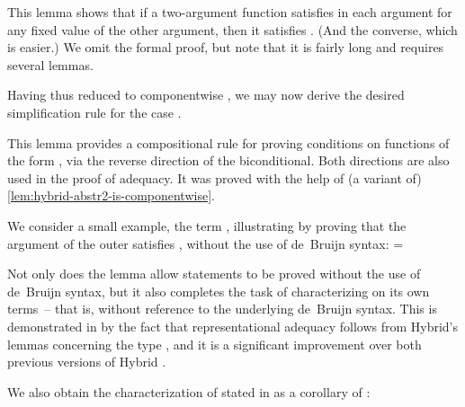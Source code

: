 \documentclass[copyright,creativecommons]{eptcs}
\begin{document}
This lemma shows that if a two-argument function satisfies  in
each argument for any fixed value of the other argument, then it satisfies
.  (And the converse, which is easier.)
We omit the formal proof, but note that it is fairly long and requires
several lemmas.

Having thus reduced  to componentwise ,
we may now derive the desired simplification rule for the case
.

\begin{Lem}
\label{lem:hybrid-abstr-LAM} \formal
\par\nopagebreak 
\end{Lem}

This lemma provides a compositional rule for proving  conditions
on functions of the form , via the reverse
direction of the biconditional.  Both directions are also used in the proof
of adequacy.  It was proved with the help of (a variant of)
\autoref{lem:hybrid-abstr2-is-componentwise}.

We consider a small example, the term ,
illustrating  by proving that the argument of the outer
 satisfies , without the use of de~Bruijn syntax:
{=\hbox{}
 \xdef\ajmtemp{\the\wd0}}
\begin{Display} \formal
\makebox[\ajmtemp][l]{}\par\nopagebreak
\makebox[\ajmtemp][l]{}\par\nopagebreak
\makebox[\ajmtemp][l]{}\par\nopagebreak\vspace{4pt}
\makebox[\ajmtemp][l]{}\par\nopagebreak
\makebox[\ajmtemp][l]{}\par\nopagebreak
\makebox[\ajmtemp][l]{}\par\nopagebreak\vspace{4pt}
\makebox[\ajmtemp][l]{}
\end{Display}

Not only does the lemma  allow  statements
to be proved without the use of de~Bruijn syntax, but it also
completes the task of characterizing  on its own terms~--
that is, without reference to the underlying de~Bruijn syntax.
This is demonstrated in \cite{martin:2010a} by the fact that representational
adequacy follows from Hybrid's lemmas concerning the type ,
and it is a significant improvement over both previous versions of Hybrid
\cite{ambler/crole/momigliano:2002,momigliano/martin/felty:2008}.

We also obtain the characterization of  stated in
 as a corollary of :
\end{document}
